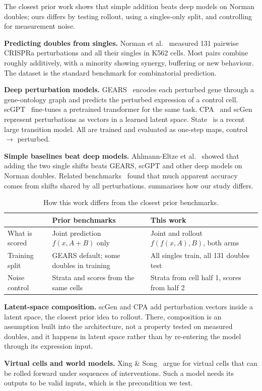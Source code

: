 The closest prior work shows that simple addition beats deep models on Norman doubles; ours
differs by testing rollout, using a singles-only split, and controlling for measurement
noise.

\noindent\textbf{Predicting doubles from singles.} Norman et al.~\cite{norman2019} measured
131 pairwise CRISPRa perturbations and all their singles in K562 cells. Most pairs combine
roughly additively, with a minority showing synergy, buffering or new behaviour. The dataset
is the standard benchmark for combinatorial prediction.

\noindent\textbf{Deep perturbation models.} GEARS~\cite{roohani2024gears} encodes each
perturbed gene through a gene-ontology graph and predicts the perturbed expression of a
control cell. scGPT~\cite{cui2024scgpt} fine-tunes a pretrained transformer for the same
task. CPA~\cite{lotfollahi2023cpa} and scGen~\cite{lotfollahi2019scgen} represent
perturbations as vectors in a learned latent space. State~\cite{arc2025state} is a recent
large transition model. All are trained and evaluated as one-step maps, control $\to$
perturbed.

\noindent\textbf{Simple baselines beat deep models.} Ahlmann-Eltze et al.~\cite{ahlmann2025} showed that adding the two single shifts beats GEARS, scGPT and
other deep models on Norman doubles. Related
benchmarks~\cite{wenteler2024perteval,csendes2024benchmark,vinas2025systema} found that much
apparent accuracy comes from shifts shared by all perturbations.  summarises
how our study differs.

\begin{table}[htb]
\centering
\small
\begin{tabularx}{\linewidth}{lXX}
\toprule
 & Prior benchmarks & This work \\
\midrule
What is scored & Joint prediction $f(x, A{+}B)$ only & Joint and rollout $f(f(x, A), B)$, both arms \\
Training split & GEARS default; some doubles in training & All singles train, all 131 doubles test \\
Noise control & Strata and scores from the same cells & Strata from cell half 1, scores from half 2 \\
\bottomrule
\end{tabularx}
\caption{How this work differs from the closest prior benchmarks.}
\label{tab:diff}
\end{table}

\noindent\textbf{Latent-space composition.} scGen and CPA add perturbation vectors inside a
latent space, the closest prior idea to rollout. There, composition is an assumption built
into the architecture, not a property tested on measured doubles, and it happens in latent
space rather than by re-entering the model through its expression input.

\noindent\textbf{Virtual cells and world models.} Xing \& Song~\cite{xingsong2026} argue for
virtual cells that can be rolled forward under sequences of interventions. Such a model
needs its outputs to be valid inputs, which is the precondition we test.

